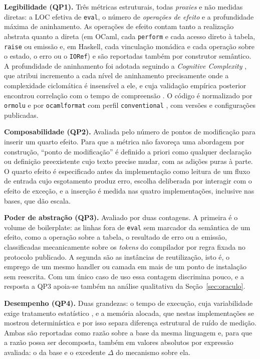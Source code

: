 \documentclass[12pt]{article}
\begin{document}
\textbf{Legibilidade (QP1).} Três métricas estruturais, todas
\textit{proxies} e não medidas diretas: a LOC efetiva de \texttt{eval}, o
número de \textit{operações de efeito} e a profundidade máxima de aninhamento.
As operações de efeito contam tanto a realização abstrata
quanto a direta (em OCaml, cada \texttt{perform} e cada acesso direto à
tabela, \texttt{raise} ou emissão e, em Haskell, cada vinculação monádica e cada
operação sobre o estado, o erro ou o \texttt{IORef}) e são reportadas também por
construtor semântico. A profundidade de aninhamento foi adotada
seguindo a \textit{Cognitive Complexity} \cite{campbell:18}, que atribui
incremento a cada nível de aninhamento precisamente onde a complexidade
ciclomática \cite{mccabe:76} é insensível a ele, e cuja validação empírica
posterior encontrou correlação com o tempo de compreensão
\cite{munozbaron:20}. O código é normalizado por \texttt{ormolu} e por \texttt{ocamlformat} com
perfil \texttt{conventional} \cite{ormolu:tool,ocamlformat:tool}, com versões
e configurações publicadas.

\textbf{Composabilidade (QP2).} Avaliada pelo número de pontos de modificação
para inserir um quarto efeito. Para que a métrica não favoreça uma abordagem
por construção, ``ponto de modificação'' é definido a priori como qualquer
declaração ou definição preexistente cujo texto precise mudar, com as adições
puras à parte. O quarto efeito é especificado antes da implementação como
leitura de um fluxo de entrada cujo esgotamento produz erro, escolha
deliberada por interagir com o efeito de exceção, e a inserção é medida nas
quatro implementações, inclusive nas bases, que dão escala.

\textbf{Poder de abstração (QP3).} Avaliado por duas contagens. A primeira é
o volume de boilerplate: as linhas fora de \texttt{eval} sem marcador
da semântica de um efeito, como a operação sobre a tabela, o resultado de erro
ou a emissão, classificadas mecanicamente sobre os \textit{tokens} do
compilador por regra fixada no protocolo publicado. A segunda são as
instâncias de reutilização, isto é, o emprego de um mesmo handler ou
camada em mais de um ponto de instalação sem reescrita. Com um único caso de uso essa contagem discrimina pouco, e a
resposta a QP3 apoia-se também na análise qualitativa da
Seção~\ref{sec:oraculo}.

\textbf{Desempenho (QP4).} Duas grandezas: o tempo de execução,
cuja variabilidade exige tratamento estatístico \cite{georges:07}, e a memória
alocada, que nestas implementações se mostrou determinística e por isso separa
diferença estrutural de ruído de medição. Ambas são reportadas como razão sobre
a base da mesma linguagem e, para que a razão possa ser decomposta, também em
valores absolutos por expressão avaliada: o da base e o excedente $\Delta$ do
mecanismo sobre ela.
\end{document}
